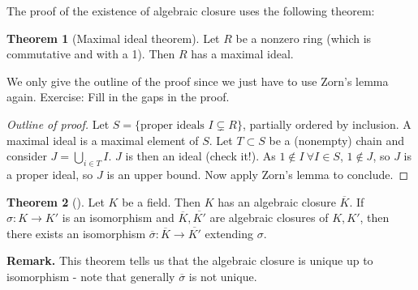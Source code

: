 \documentclass{article}
\theoremstyle{definition}
\newtheorem{theorem}{Theorem}[section]
\begin{document}
The proof of the existence of algebraic closure uses the following theorem:
\begin{theorem}[Maximal ideal theorem]
    Let $R$ be a nonzero ring (which is commutative and with a 1). Then $R$ has a maximal ideal.
\end{theorem}
We only give the outline of the proof since we just have to use Zorn's lemma again. Exercise: Fill in the gaps in the proof.
\begin{proof}[Outline of proof]
    Let $S = \{\text{proper ideals }I \subsetneq R\}$, partially ordered by inclusion. A maximal ideal is a maximal element of $S$. Let $T \subset S$ be a (nonempty) chain and consider $J = \bigcup_{i \in  T} I$. $J$ is then an ideal (check it!). As $1 \not\in I ~\forall I \in S$, $1 \not\in J$, so $J$ is a proper ideal, so $J$ is an upper bound. Now apply Zorn's lemma to conclude.
\end{proof}
\begin{theorem}[]
    Let $K$ be a field. Then $K$ has an algebraic closure $\overline{K}$. If $\sigma: K \to K'$ is an isomorphism and $\overline{K}, \overline{K'}$ are algebraic closures of $K, K'$, then there exists an isomorphism $\overline{\sigma}: \overline{K} \to \overline{K'}$ extending $\sigma$.
\end{theorem}
\textbf{Remark.} This theorem tells us that the algebraic closure is unique up to isomorphism - note that generally $\overline{\sigma}$ is not unique.
\end{document}
